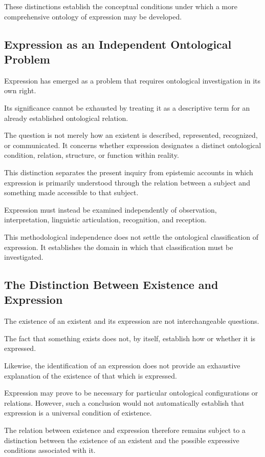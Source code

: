 These distinctions establish the conceptual conditions
under which a more comprehensive ontology of expression
may be developed.

\subsection{Expression as an Independent Ontological Problem}

Expression has emerged as a problem that requires
ontological investigation in its own right.

Its significance cannot be exhausted by treating it
as a descriptive term for an already established
ontological relation.

The question is not merely how an existent is described,
represented, recognized, or communicated. It concerns
whether expression designates a distinct ontological
condition, relation, structure, or function within reality.

This distinction separates the present inquiry from
epistemic accounts in which expression is primarily
understood through the relation between a subject
and something made accessible to that subject.

Expression must instead be examined independently
of observation, interpretation, linguistic articulation,
recognition, and reception.

This methodological independence does not settle
the ontological classification of expression. It
establishes the domain in which that classification
must be investigated.

\subsection{The Distinction Between Existence and Expression}

The existence of an existent and its expression
are not interchangeable questions.

The fact that something exists does not, by itself,
establish how or whether it is expressed.

Likewise, the identification of an expression does
not provide an exhaustive explanation of the existence
of that which is expressed.

Expression may prove to be necessary for particular
ontological configurations or relations. However,
such a conclusion would not automatically establish
that expression is a universal condition of existence.

The relation between existence and expression therefore
remains subject to a distinction between the existence
of an existent and the possible expressive conditions
associated with it.

